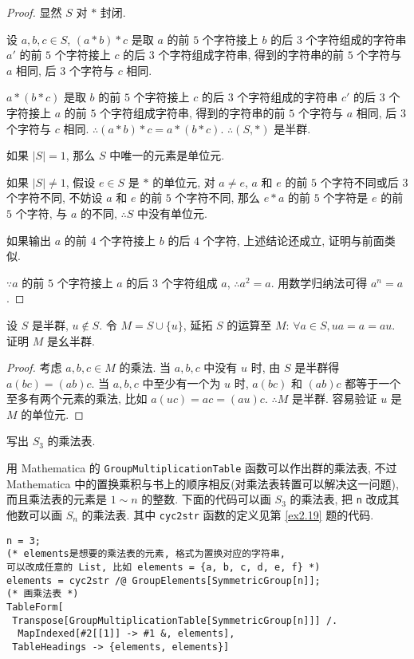 \documentclass[color=black,device=normal,lang=cn,mode=geye]{elegantnote}
\begin{document}
\begin{proof}
    显然 $S$ 对 $*$ 封闭.

    设 $a,b,c\in S$, $(a*b)*c$ 是取 $a$ 的前 $5$ 个字符接上 $b$ 的后 $3$ 个字符组成的字符串 $a'$ 的前 $5$ 个字符接上 $c$ 的后 $3$ 个字符组成字符串, 得到的字符串的前 $5$ 个字符与 $a$ 相同, 后 $3$ 个字符与 $c$ 相同.
    
    $a*(b*c)$ 是取 $b$ 的前 $5$ 个字符接上 $c$ 的后 $3$ 个字符组成的字符串 $c'$ 的后 $3$ 个字符接上 $a$ 的前 $5$ 个字符组成字符串, 得到的字符串的前 $5$ 个字符与 $a$ 相同, 后 $3$ 个字符与 $c$ 相同. $\therefore(a*b)*c=a*(b*c)$. $\therefore(S,*)$ 是半群.

    如果 $|S|=1$, 那么 $S$ 中唯一的元素是单位元.
    
    如果 $|S|\neq1$, 假设 $e\in S$ 是 $*$ 的单位元, 对 $a\neq e$, $a$ 和 $e$ 的前 $5$ 个字符不同或后 $3$ 个字符不同, 不妨设 $a$ 和 $e$ 的前 $5$ 个字符不同, 那么 $e*a$ 的前 $5$ 个字符是 $e$ 的前 $5$ 个字符, 与 $a$ 的不同, $\therefore S$ 中没有单位元.

    如果输出 $a$ 的前 $4$ 个字符接上 $b$ 的后 $4$ 个字符, 上述结论还成立, 证明与前面类似.

    $\because a$ 的前 $5$ 个字符接上 $a$ 的后 $3$ 个字符组成 $a$, $\therefore a^2=a$. 用数学归纳法可得 $a^n=a$.
\end{proof}
\begin{exercisec}[5.1.5]
    设 $S$ 是半群, $u\notin S$. 令 $M=S\cup\{u\}$, 延拓 $S$ 的运算至 $M$: $\forall a\in S,ua=a=au$. 证明 $M$ 是幺半群.
\end{exercisec}
\begin{proof}
    考虑 $a,b,c\in M$ 的乘法. 当 $a,b,c$ 中没有 $u$ 时, 由 $S$ 是半群得 $a(bc)=(ab)c$. 当 $a,b,c$ 中至少有一个为 $u$ 时, $a(bc)$ 和 $(ab)c$ 都等于一个至多有两个元素的乘法, 比如 $a(uc)=ac=(au)c$. $\therefore M$ 是半群. 容易验证 $u$ 是 $M$ 的单位元.
\end{proof}
\begin{exercisec}[5.2.1]
    写出 $S_3$ 的乘法表.
\end{exercisec}
\begin{solution}
    用 Mathematica 的 \verb|GroupMultiplicationTable| 函数可以作出群的乘法表, 不过 Mathematica 中的置换乘积与书上的顺序相反(对乘法表转置可以解决这一问题), 而且乘法表的元素是 $1\sim n$ 的整数. 下面的代码可以画 $S_3$ 的乘法表, 把 \verb|n| 改成其他数可以画 $S_n$ 的乘法表. 其中 \verb|cyc2str| 函数的定义见第 \ref{ex2.19} 题的代码.
    \begin{lstlisting}
n = 3;
(* elements是想要的乘法表的元素, 格式为置换对应的字符串,
可以改成任意的 List, 比如 elements = {a, b, c, d, e, f} *)
elements = cyc2str /@ GroupElements[SymmetricGroup[n]];
(* 画乘法表 *)
TableForm[
 Transpose[GroupMultiplicationTable[SymmetricGroup[n]]] /. 
  MapIndexed[#2[[1]] -> #1 &, elements], 
 TableHeadings -> {elements, elements}]\end{lstlisting}
\end{solution}
\end{document}
